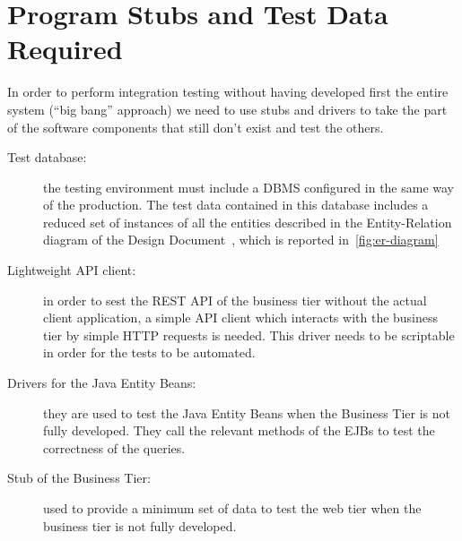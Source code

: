 \chapter{Program Stubs and Test Data Required}
\label{chap:stubs}

In order to perform integration testing without having developed first the entire system (``big bang'' approach) we need to use stubs and drivers to take the part of the software components that still don't exist and test the others.

\begin{description}
    \item[Test database:] the testing environment must include a DBMS configured in the same way of the production. The test data contained in this database includes a reduced set of instances of all the entities described in the Entity-Relation diagram of the Design Document~\cite[p.~10]{mytaxi-dd}, which is reported in~\autoref{fig:er-diagram}

    \item[Lightweight API client:] in order to sest the REST API of the business tier without the actual client application, a simple API client which interacts with the business tier by simple HTTP requests is needed. This driver needs to be scriptable in order for the tests to be automated.

    \item[Drivers for the Java Entity Beans:] they are used to test the Java Entity Beans when the Business Tier is not fully developed. They call the relevant methods of the EJBs to test the correctness of the queries.

    \item[Stub of the Business Tier:] used to provide a minimum set of data to test the web tier when the business tier is not fully developed.
\end{description}

